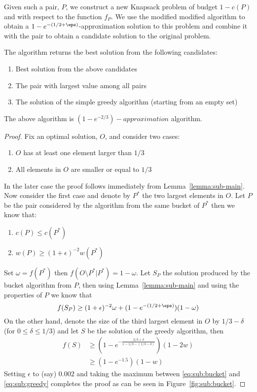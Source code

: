 Given such a pair, $P$, we construct a new Knapsack problem of budget $1 - c(P)$ and with 
respect to the function $f_P$.
We use the modified modified algorithm to obtain a $1-e^{-(1/2 + \eps)}$-approximation
solution to this problem and combine it with the pair to obtain a candidate 
solution to the original problem.

The algorithm returns the best solution from the following candidates:
\begin{enumerate}
  \item Best solution from the above candidates
  \item The pair with  largest value among all pairs
  \item The solution of the simple greedy algorithm (starting from an empty set)
\end{enumerate}       

\begin{theorem}
The above algorithm is $(1 - e^{-2/3})-approximation$ algorithm.
\end{theorem}

\begin{proof}
Fix an optimal solution, $O$, and consider two cases:
\begin{enumerate}
  \item $O$ has at least one element larger than $1/3$
  \item All elements in $O$ are smaller or equal to $1/3$
\end{enumerate}
In the later case the proof follows immediately from Lemma~\ref{lemma:sub-main}.
Now consider the first case and denote by $P^*$ the two largest elements in $O$.
Let $P$ be the pair considered by the algorithm from the same bucket of $P^*$ then we know
that:
\begin{enumerate}
  \item $c(P) \leq c(P^*)$
  \item $w(P) \geq (1 + \epsilon)^{-2}w(P^*)$
\end{enumerate}
Set $\omega = f(P^*)$ then $f(O\setminus P^* | P^*) = 1 - \omega$.
Let $S_P$ the solution produced by the bucket algorithm from $P$, 
then using Lemma~\ref{lemma:sub-main} and using the properties of $P$ we know that
\begin{equation}
\label{eq:sub:bucket}
f(S_P) \geq (1 + \epsilon)^{-2}\omega + (1-e^{-(1/2 + \eps)})(1 - \omega)
\end{equation}
On the other hand, denote the size of the third largest element in $O$ by $1/3 - \delta$
(for $0 \leq \delta \leq 1/3$) and  let $S$ be the solution of the greedy algorithm, then 
\begin{align}
\label{eq:sub:greedy}
f(S) & \geq (1 - e^{-\frac{2/3 + \delta}{1 - 1/3 - (1/3 - \delta)}})(1 - 2w) 
\\
& \geq (1 - e^{-1.5})(1-w)
\end{align}
Setting $\epsilon$ to (say) $0.002$ and taking the maximum between \ref{eq:sub:bucket} and
\ref{eq:sub:greedy} completes the proof as can be seen in Figure~\ref{fig:sub:bucket}.
\end{proof}

